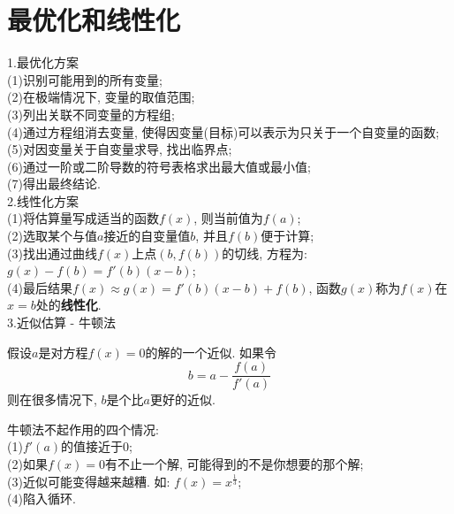 \chapter{最优化和线性化}
1.最优化方案\\
(1)识别可能用到的所有变量;\\
(2)在极端情况下, 变量的取值范围;\\
(3)列出关联不同变量的方程组;\\
(4)通过方程组消去变量, 使得因变量(目标)可以表示为只关于一个自变量的函数;\\
(5)对因变量关于自变量求导, 找出临界点;\\
(6)通过一阶或二阶导数的符号表格求出最大值或最小值;\\
(7)得出最终结论.\\[2ex]

2.线性化方案\\
(1)将估算量写成适当的函数$f(x)$, 则当前值为$f(a)$;\\
(2)选取某个与值$a$接近的自变量值$b$, 并且$f(b)$便于计算;\\
(3)找出通过曲线$f(x)$上点$(b,f(b))$的切线, 方程为: $g(x)-f(b)=f'(b)(x-b)$;\\
(4)最后结果$f(x)\approx g(x)=f'(b)(x-b)+f(b)$, 函数$g(x)$称为$f(x)$在$x=b$处的\textbf{线性化}.\\[2ex]

3.近似估算 - 牛顿法
\begin{theorem}[牛顿法]
假设$a$是对方程$f(x)=0$的解的一个近似. 如果令
\[b=a-\frac{f(a)}{f'(a)}\]
则在很多情况下, $b$是个比$a$更好的近似.
\end{theorem}

牛顿法不起作用的四个情况:\\
(1)$f'(a)$的值接近于$0$;\\
(2)如果$f(x)=0$有不止一个解, 可能得到的不是你想要的那个解;\\
(3)近似可能变得越来越糟. 如: $f(x)=x^{\frac{1}{3}}$;\\
(4)陷入循环.\\
